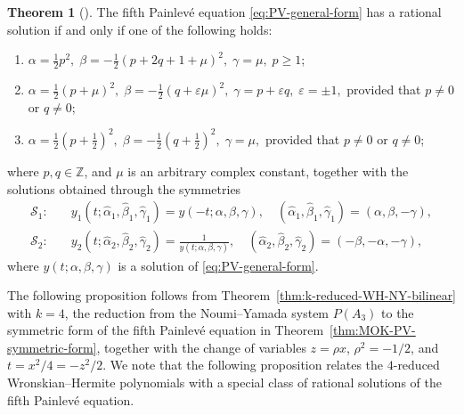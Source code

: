 \documentclass[preprint,3p,10pt]{elsarticle}
\theoremstyle{definition}
\newtheorem{theorem}{Theorem}[section]
\begin{document}
\begin{theorem}[\cite{clarkson2024rational}]\label{thm:Classification of rational solutions of PV}
The fifth Painlev\'e equation \eqref{eq:PV-general-form} has a rational solution if and only if one of the following holds:
\begin{enumerate}
    \item[(i)] $\alpha=\frac{1}{2}p^2,\;
        \beta=-\frac{1}{2}(p+2q+1+\mu)^2,\;
        \gamma=\mu,
        \; p\geq 1$;

    \item[(ii)] $\alpha=\frac{1}{2}(p+\mu)^2,\;
        \beta=-\frac{1}{2}(q+\varepsilon\mu)^2,\;
        \gamma=p+\varepsilon q,
        \; \varepsilon=\pm1,$    provided that \(p\neq0\) or \(q\neq0\);

    \item[(iii)] $\alpha=\frac{1}{2}\left(p+\frac{1}{2}\right)^2,\;
        \beta=-\frac{1}{2}\left(q+\frac{1}{2}\right)^2,\;
        \gamma=\mu,$    provided that \(p\neq0\) or \(q\neq0\);
\end{enumerate}
where \(p,q\in\mathbb Z\), and \(\mu\) is an arbitrary complex constant, together with the solutions obtained through the symmetries
\begin{align}
    \mathcal{S}_1 : \quad & y_1\left(t;\hat  \alpha_1,\hat  \beta_1,\hat  \gamma_1\right) = y\left(-t; \alpha, \beta, \gamma\right), \quad \left(\hat \alpha_1,\hat  \beta_1, \hat \gamma_1\right) = \left(\alpha, \beta, -\gamma\right), \label{eq:sym1} \\[1em]
    \mathcal{S}_2 : \quad & y_2\left(t;\hat  \alpha_2,\hat  \beta_2,\hat  \gamma_2\right) = \frac{1}{y\left(t; \alpha, \beta, \gamma\right)}, \quad \left(\hat \alpha_2,\hat  \beta_2,\hat  \gamma_2\right) = \left(-\beta, -\alpha, -\gamma\right), \label{eq:sym2}
\end{align}
where \(y(t; \alpha, \beta, \gamma)\) is a solution of \eqref{eq:PV-general-form}.
\end{theorem}


The following proposition follows from Theorem~\ref{thm:k-reduced-WH-NY-bilinear}
with \(k=4\), the reduction from the Noumi--Yamada system \(P(A_3)\) to the
symmetric form of the fifth Painlev\'e equation in
Theorem~\ref{thm:MOK-PV-symmetric-form}, together with the change of
variables \(z=\rho x\), \(\rho^2=-1/2\), and
\(t=x^2/4=-z^2/2\). We note that the following proposition relates the \(4\)-reduced Wronskian--Hermite
polynomials with a special class of rational solutions of the fifth Painlev\'e equation.
\end{document}
